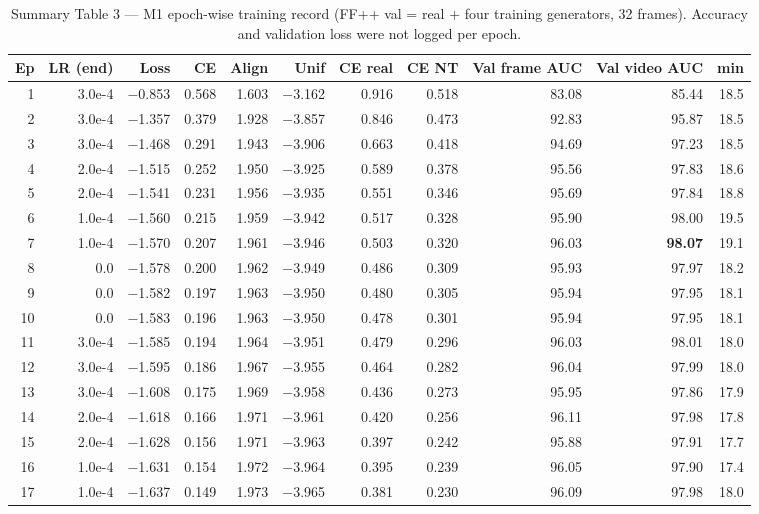 \documentclass[10pt,a4paper]{article}
\begin{document}
\begin{table}[H]\centering\small
\caption{Summary Table 3 --- M1 epoch-wise training record (FF++ val = real + four training generators, 32 frames). Accuracy and validation loss were not logged per epoch.}\label{tab:m1epochs}
\begin{tabular}{@{}rrrrrrrrrrr@{}}
\toprule
Ep & LR (end) & Loss & CE & Align & Unif & CE real & CE NT & Val frame AUC & Val video AUC & min\\
\midrule
1 & 3.0e-4 & $-$0.853 & 0.568 & 1.603 & $-$3.162 & 0.916 & 0.518 & 83.08 & 85.44 & 18.5\\
2 & 3.0e-4 & $-$1.357 & 0.379 & 1.928 & $-$3.857 & 0.846 & 0.473 & 92.83 & 95.87 & 18.5\\
3 & 3.0e-4 & $-$1.468 & 0.291 & 1.943 & $-$3.906 & 0.663 & 0.418 & 94.69 & 97.23 & 18.5\\
4 & 2.0e-4 & $-$1.515 & 0.252 & 1.950 & $-$3.925 & 0.589 & 0.378 & 95.56 & 97.83 & 18.6\\
5 & 2.0e-4 & $-$1.541 & 0.231 & 1.956 & $-$3.935 & 0.551 & 0.346 & 95.69 & 97.84 & 18.8\\
6 & 1.0e-4 & $-$1.560 & 0.215 & 1.959 & $-$3.942 & 0.517 & 0.328 & 95.90 & 98.00 & 19.5\\
7 & 1.0e-4 & $-$1.570 & 0.207 & 1.961 & $-$3.946 & 0.503 & 0.320 & 96.03 & \textbf{98.07} & 19.1\\
8 & 0.0 & $-$1.578 & 0.200 & 1.962 & $-$3.949 & 0.486 & 0.309 & 95.93 & 97.97 & 18.2\\
9 & 0.0 & $-$1.582 & 0.197 & 1.963 & $-$3.950 & 0.480 & 0.305 & 95.94 & 97.95 & 18.1\\
10 & 0.0 & $-$1.583 & 0.196 & 1.963 & $-$3.950 & 0.478 & 0.301 & 95.94 & 97.95 & 18.1\\
11 & 3.0e-4 & $-$1.585 & 0.194 & 1.964 & $-$3.951 & 0.479 & 0.296 & 96.03 & 98.01 & 18.0\\
12 & 3.0e-4 & $-$1.595 & 0.186 & 1.967 & $-$3.955 & 0.464 & 0.282 & 96.04 & 97.99 & 18.0\\
13 & 3.0e-4 & $-$1.608 & 0.175 & 1.969 & $-$3.958 & 0.436 & 0.273 & 95.95 & 97.86 & 17.9\\
14 & 2.0e-4 & $-$1.618 & 0.166 & 1.971 & $-$3.961 & 0.420 & 0.256 & 96.11 & 97.98 & 17.8\\
15 & 2.0e-4 & $-$1.628 & 0.156 & 1.971 & $-$3.963 & 0.397 & 0.242 & 95.88 & 97.91 & 17.7\\
16 & 1.0e-4 & $-$1.631 & 0.154 & 1.972 & $-$3.964 & 0.395 & 0.239 & 96.05 & 97.90 & 17.4\\
17 & 1.0e-4 & $-$1.637 & 0.149 & 1.973 & $-$3.965 & 0.381 & 0.230 & 96.09 & 97.98 & 18.0\\

\end{tabular}
\end{table}
\end{document}
